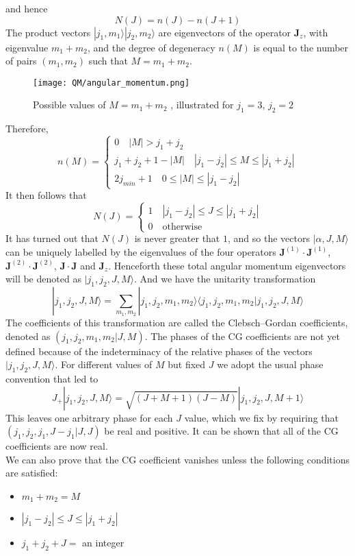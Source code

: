 and hence
\[N(J) = n(J) - n(J+1)\]
The product vectors $|j_1,m_1\rangle |j_2,m_2\rangle$ are eigenvectors of the operator $\bm{J}_z$, with eigenvalue $m_1+m_2$, and the degree of degeneracy $n(M)$ is equal to the number of pairs $(m_1,m_2)$ such that $M=m_1+m_2$.
\begin{figure}[!h]
	\centering
	\texttt{[image: QM/angular\_momentum.png]}
	\caption{Possible values of $M=m_1+m_2$ , illustrated for $j_1=3$, $j_2=2$}
\end{figure}
Therefore,
\[n(M)=\begin{cases} 0 \quad |M| > j_1 + j_2\\ j_1+j_2+1-|M|\quad |j_1-j_2| \leq M \leq |j_1+j_2|\\ 2j_{min}+1 \quad 0 \leq |M|\leq |j_1-j_2|\end{cases} \]
It then follows that
\[N(J)=\begin{cases} 1 \quad |j_1-j_2| \leq J \leq |j_1+j_2|\\ 0 \quad \mbox{otherwise}\end{cases} \]
It has turned out that $N(J)$ is never greater that $1$, and so the vectors $|\alpha, J, M \rangle$ can be uniquely labelled by the eigenvalues of the four operators $\bm{J}^{(1)}\cdot\bm{J}^{(1)}$, $\bm{J}^{(2)}\cdot\bm{J}^{(2)}$, $\bm{J}\cdot\bm{J}$ and $\bm{J}_z$. Henceforth these total angular momentum
eigenvectors will be denoted as $|j_1,j_2,J,M\rangle$. And we have the unitarity transformation 
\[|j_1,j_2,J,M\rangle = \sum_{m_1,m_2} |j_1,j_2,m_1,m_2\rangle \langle j_1,j_2,m_1,m_2 | j_1,j_2,J,M\rangle\]
The coefficients of this transformation are called the Clebsch–Gordan coefficients, denoted as $(j_1,j_2,m_1,m_2|J,M)$.
The phases of the CG coefficients are not yet defined because of the indeterminacy of the relative phases of the vectors $|j_1,j_2,J,M\rangle$. For different values of $M$ but fixed $J$ we adopt the usual phase convention that led to
\[J_+ |j_1,j_2,J,M\rangle = \sqrt{(J+M+1)(J-M)} |j_1,j_2,J,M+1\rangle\]
This leaves one arbitrary phase for each $J$ value, which we fix by requiring that $(j_1,j_2,j_1,J-j_1|J,J)$ be real and positive. It can be shown that all of the CG coefficients are now real.\\
We can also prove that the CG coefficient vanishes unless the following conditions are satisfied:
\begin{itemize}
\item $m_1+m_2=M$
\item $|j_1-j_2| \leq J \leq |j_1+j_2|$
\item $j_1+j_2+J =$ an integer
\end{itemize}
